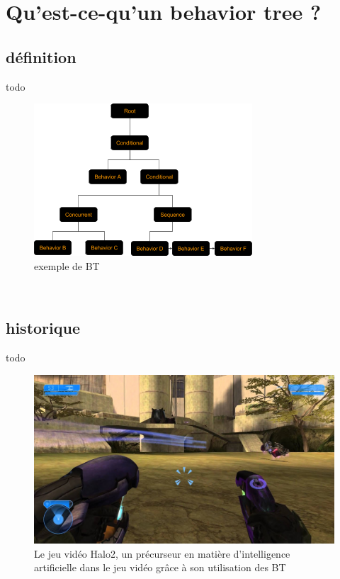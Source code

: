 \documentclass[titlepage]{article}
\begin{document}
	\section{Qu'est-ce-qu'un behavior tree ?}
		\subsection{définition}
	todo
	\\
	\begin{figure}[h!]
		\includegraphics[width=\linewidth]{img/behavior_trees_example.png}
		\caption{exemple de BT \cite{rasmussen}}
		\label{fig:BT1}
	\end{figure}
	\\
		\subsection{historique}
	todo
	\\
	\begin{figure}[h!]
		\includegraphics[width=\linewidth]{img/halo2.jpg}
		\caption{Le jeu vidéo Halo2, un précurseur en matière d'intelligence artificielle dans le jeu vidéo grâce à son utilisation des BT \cite{wikipedia_halo}}
		\label{fig:BT1}
	\end{figure}
	\\
	
\end{document}
